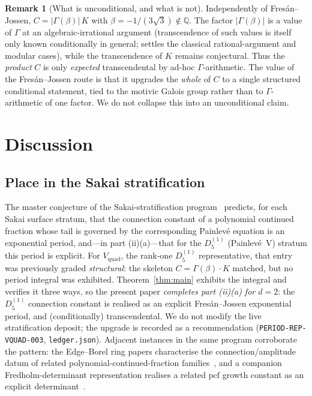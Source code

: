 \documentclass[11pt,reqno]{amsart}
\theoremstyle{plain}
\theoremstyle{definition}
\newtheorem{remark}[theorem]{Remark}
\newcommand{\Vquad}{V_{\mathrm{quad}}}
\providecommand{\C}{}\renewcommand{\C}{C}
\begin{document}
\begin{remark}[What is unconditional, and what is not]\label{rmk:uncond}
Independently of Fres\'an--Jossen, $\C=\lvert\Gamma(\beta)\rvert\,K$ with
$\beta=-1/(3\sqrt3)\notin\mathbb{Q}$. The factor $\lvert\Gamma(\beta)\rvert$ is a value of
$\Gamma$ at an algebraic-irrational argument (transcendence of such values is itself only known
conditionally in general; \cite{Nesterenko} settles the classical rational-argument and modular
cases), while the transcendence of $K$ remains conjectural. Thus the \emph{product} $\C$ is only
\emph{expected} transcendental by ad-hoc $\Gamma$-arithmetic. The value of the Fres\'an--Jossen
route is that it upgrades the \emph{whole} of $\C$ to a single structured conditional statement,
tied to the motivic Galois group rather than to $\Gamma$-arithmetic of one factor. We do not
collapse this into an unconditional claim.
\end{remark}

\section{Discussion}\label{sec:disc}

\subsection{Place in the Sakai stratification}
The master conjecture of the Sakai-stratification program~\cite{Sakai} predicts, for each Sakai
surface stratum, that the connection constant of a polynomial continued fraction whose tail is
governed by the corresponding Painlev\'e equation is an exponential period, and---in part
(ii)(a)---that for the $D_5^{(1)}$ (Painlev\'e~V) stratum this period is explicit. For $\Vquad$,
the rank-one $D_5^{(1)}$ representative, that entry was previously graded \emph{structural}: the
skeleton $\C=\Gamma(\beta)\cdot K$ matched, but no period integral was exhibited.
Theorem~\ref{thm:main} exhibits the integral and verifies it three ways, so the present paper
\emph{completes part (ii)(a) for $d=2$}: the $D_5^{(1)}$ connection constant is realised as an
explicit Fres\'an--Jossen exponential period, and (conditionally) transcendental. We do not modify
the live stratification deposit; the upgrade is recorded as a recommendation
(\texttt{PERIOD-REP-VQUAD-003}, \texttt{ledger.json}). Adjacent instances in the same program
corroborate the pattern: the Edge--Borel ring papers characterise the connection/amplitude datum of
related polynomial-continued-fraction families~\cite{EBRIb,EBRII}, and a companion
Fredholm-determinant representation realises a related $\mathrm{pcf}$ growth constant as an explicit
determinant~\cite{FredDelta}.
\end{document}
